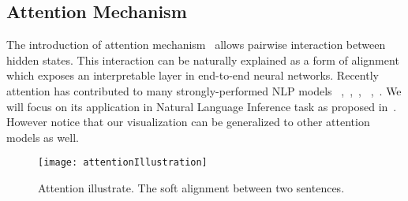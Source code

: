 \subsection{Attention Mechanism}
\label{sec:attention}
The introduction of attention mechanism~\cite{bahdanau2014neural} allows
pairwise interaction between hidden states. This interaction can be naturally explained
as a form of alignment which exposes an interpretable layer in end-to-end neural networks.
Recently attention has contributed to many strongly-performed NLP models
~\cite{parikh2016emnlp},~\cite{rush2015neural},~\cite{yang2016hierarchical},
~\cite{seo2016bidirectional},~\cite{schwartz2017high}.
We will focus on its application in Natural Language Inference task as proposed in~\cite{parikh2016emnlp}.
However notice that our visualization can be generalized to other attention models as well.

\begin{figure}[htbp]
\centering
\vspace{-2mm}
 \texttt{[image: attentionIllustration]}
 \caption{Attention illustrate. The soft alignment between two sentences.}
\label{fig:attention}
\end{figure}

